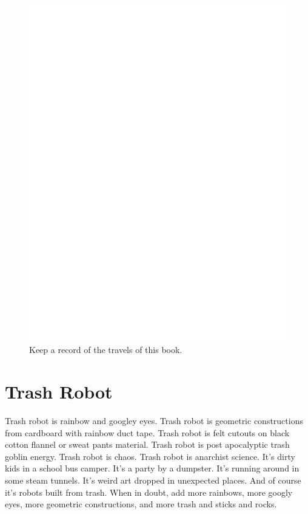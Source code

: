 \documentclass{report}
\begin{document}
 \begin{figure}
	\centering
	\includegraphics[width=5in]{imageserver/uploadimages/image3.png}
	\caption[places]
	{Keep a record of the travels of this book.}
\end{figure}


\section{Trash Robot}

Trash robot is rainbow and googley eyes.   Trash robot is geometric constructions from cardboard with rainbow duct tape.   Trash robot is felt cutouts on black cotton flannel or sweat pants material.  Trash robot is post apocalyptic trash goblin energy.   Trash robot is chaos.  Trash robot is anarchist science. It's dirty kids in a school bus camper. It's a party by a dumpster.  It's running around in some steam tunnels.  It's weird art dropped in unexpected places. And of course it's robots built from trash.  When in doubt, add more rainbows, more googly eyes, more geometric constructions, and more trash and sticks and rocks.
\end{document}
